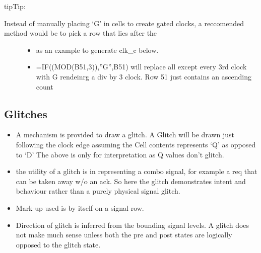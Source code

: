 \documentclass[letterpaper,10pt,english]{sphinxmanual}
\begin{document}
\begin{sphinxadmonition}{tip}{Tip:}\begin{description}
\item[{Instead of manually placing ‘G’ in cells to create gated clocks, a reccomended method would be to pick a row that lies after the}] \leavevmode\begin{itemize}
\item {} 
as an example  to generate clk\_c below.

\item {} 
=IF((MOD(B51,3)),”G”,B51) will replace all except every 3rd clock with G rendeinrg a div by 3 clock. Row 51 just contains an ascending count

\end{itemize}

\end{description}
\end{sphinxadmonition}


\subsection{Glitches}
\label{\detokenize{step_by_step:glitches}}\begin{itemize}
\item {} 
A mechanism is provided to draw a glitch. A Glitch will be drawn just following the clock edge assuming the Cell contents represents ‘Q’ as opposed to ‘D’ The above is only for interpretation as Q values don’t glitch.

\item {} 
the utility of a glitch is in representing a combo signal, for example  a req that can be taken away w/o an ack. So here the glitch demonstrates intent and behaviour rather than a purely physical signal glitch.

\item {} 
Mark-up used is  by itself on a signal row.

\item {} 
Direction of glitch is inferred from the bounding signal levels. A glitch does not make much sense unless both the pre and post states are logically opposed to the glitch state.

\end{itemize}
\end{document}
